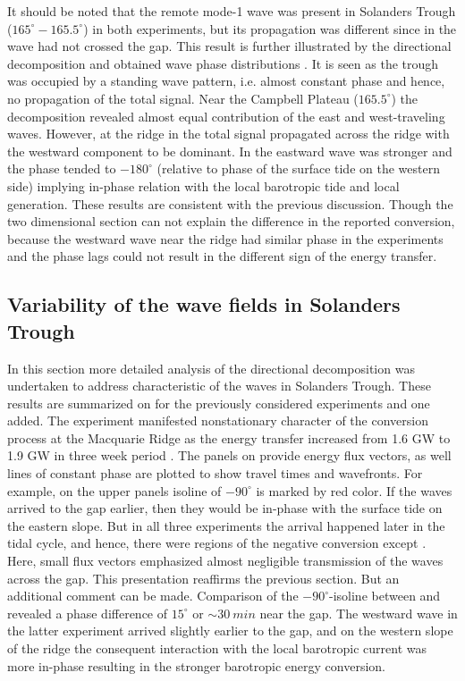 \documentclass[12pt]{article}
\begin{document}
It should be noted that the remote mode-1 wave was present in Solanders Trough 
($165^{\circ} - 165.5^{\circ}$) in both experiments, but its propagation was different since in 
 the wave had not crossed the gap. This result is further illustrated by the directional 
decomposition and obtained wave phase distributions . It is seen as 
the trough was occupied 
by a standing wave pattern, i.e. almost constant phase and hence, no propagation of the total 
signal. 
Near the Campbell Plateau ($165.5^{\circ}$) the decomposition revealed almost equal contribution 
of the east and west-traveling waves. However, at the ridge in  the total signal 
propagated across the ridge with the westward component to be dominant. In  
the eastward wave was stronger and the phase tended to $-180^{\circ}$ (relative to phase of the  
surface tide on the western side) implying in-phase relation with the local barotropic tide and 
local generation. These results are consistent with the previous discussion. Though the two 
dimensional section can not explain the difference in the reported conversion, because 
the westward wave near the ridge had similar phase in the experiments and the phase lags could not 
result in the different sign of the energy transfer.\\

\subsection{Variability of the wave fields in Solanders Trough}
\label{C3.sec:3d_var}
In this section more detailed analysis of the directional decomposition was 
undertaken to address characteristic of the waves in Solanders Trough. These results are summarized 
on 
 for the previously considered 
experiments and one added. The experiment  manifested nonstationary 
character of the conversion process at the Macquarie Ridge as the energy transfer increased from 
1.6 GW to 1.9 GW in three week period . The panels on 
provide energy flux vectors, as well lines of constant phase are plotted to show travel times and  
wavefronts. For example, on the upper panels isoline of $-90^{\circ}$ is marked by red color. If 
the 
waves arrived to the gap earlier, then they would be in-phase with the surface tide on the eastern 
slope. But in all three experiments the arrival 
happened later in the tidal cycle, and hence, there were regions of the negative conversion except 
. Here, small flux vectors emphasized almost negligible transmission 
of the waves across the gap. This presentation reaffirms the previous section. But an 
additional comment can be made. Comparison of the $-90^{\circ}$-isoline between  and 
 revealed a phase difference of $15^{\circ}$ or $\sim30~min$ near the gap. The westward 
wave in the latter experiment arrived slightly earlier to the gap, and on the western slope of the 
ridge the consequent interaction with the local barotropic current was more in-phase resulting in 
the stronger barotropic energy conversion.\\
\end{document}

